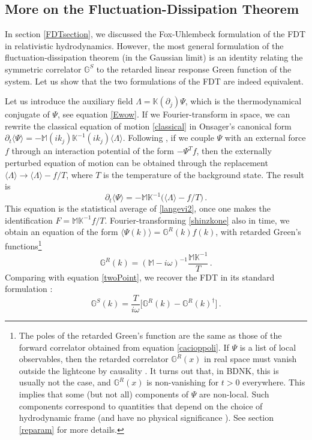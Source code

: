 \documentclass[a4paper, amsfonts, amssymb, amsmath, reprint, showkeys, nofootinbib, twoside,notitlepage,onecolumn]{revtex4-2}
\newcommand{\Ma}{{\mathbb{M}}}
\newcommand{\Ga}{{\mathbb{G}}}
\newcommand{\Ka}{{\mathbb{K}}}
\theoremstyle{definition}
\begin{document}
\subsection{More on the Fluctuation-Dissipation Theorem}

In section \ref{FDTsection}, we discussed the Fox-Uhlembeck formulation of the FDT in relativistic hydrodynamics. However, the most general formulation of the fluctuation-dissipation theorem (in the Gaussian limit) is an identity relating the symmetric correlator $\Ga^S$ to the retarded linear response Green function of the system. Let us show that the two formulations of the FDT are indeed equivalent.




Let us introduce the auxiliary field $\Lambda=\Ka(\partial_j)\Psi$, which is the thermodynamical conjugate of $\Psi$, see equation \eqref{Ewow}. If we Fourier-transform in space, we can rewrite the classical equation of motion \eqref{classical} in Onsager's canonical form $\partial_t \langle \Psi\rangle =-\Ma(ik_j)\Ka^{-1}(ik_j)\langle \Lambda \rangle $. Following \citet{landau5}, if we couple $\Psi$ with an external force $f$ through an interaction potential of the form $-\Psi^T f$, then the externally perturbed equation of motion can be obtained through the replacement $\langle \Lambda \rangle \rightarrow \langle \Lambda \rangle -f/T$, where $T$ is the temperature of the background state. The result is
\begin{equation}\label{shinzkone}
    \partial_t \langle \Psi \rangle = -\Ma \Ka^{-1} \big(\langle\Lambda\rangle -f/T \big) \, .
\end{equation}
This equation is the statistical average of \eqref{langevi2}, once one makes the identification $F=\Ma \Ka^{-1} f/T$.  Fourier-transforming \eqref{shinzkone} also in time, we obtain an equation of the form $\langle \Psi(k)\rangle = \Ga^R(k) f(k)$, with retarded Green's functions\footnote{The poles of the retarded Green's function are the same as those of the forward correlator obtained from equation \eqref{cacioppoli}. If $\Psi$ is a list of local observables, then the retarded correlator $\Ga^R(x)$ in real space must vanish outside the lightcone by causality \cite{HellerBounds2022}. It turns out that, in BDNK, this is usually not the case, and $\Ga^R(x)$ is non-vanishing for $t>0$ everywhere. This implies that some (but not all) components of $\Psi$ are non-local. Such components correspond to quantities that depend on the choice of hydrodynamic frame (and have no physical significance \cite{Kovtun2019}). See section \ref{reparam} for more details.} 
\begin{equation}
    \Ga^R(k)=(\Ma-i\omega)^{-1} \dfrac{\Ma \Ka^{-1}}{T} \, .
\end{equation}
Comparing with equation \eqref{twoPoint}, we recover the FDT in its standard formulation \cite{kovtun_lectures_2012}:
\begin{equation}
    \Ga^S(k)=\dfrac{T}{i\omega} \bigg[\Ga^R(k)-\Ga^R(k)^\dagger \bigg] \, . 
\end{equation}
\end{document}
